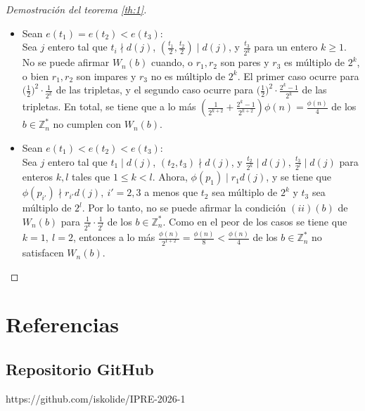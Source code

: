 \documentclass[hidelinks, 12pt]{article}
\newcommand{\Zs}{\mathbb{Z}^*}
\begin{document}
\begin{proof}[Demostración del teorema \ref{th:1}]
\begin{itemize}
\begin{enumerate}
\begin{itemize}
                \item Sean $e(t_1)=e(t_2)<e(t_3)$: \\
                Sea $j$ entero tal que $t_i\nmid d(j)$, $(\frac{t_1}{2},\frac{t_2}{2})\mid d(j)$, y $\frac{t_3}{2^k}$ para un entero $k\geq 1$. No se puede afirmar $W_n(b)$ cuando, o $r_1,r_2$ son pares y $r_3$ es múltiplo de $2^k$, o bien $r_1,r_2$ son impares y $r_3$ no es múltiplo de $2^k$. El primer caso ocurre para $\bigl(\frac{1}{2}\bigr)^2\cdot\frac{1}{2^k}$ de las tripletas, y el segundo caso ocurre para $\bigl(\frac{1}{2}\bigr)^2\cdot\frac{2^k-1}{2^k}$ de las tripletas. En total, se tiene que a lo más $\left(\frac{1}{2^{k+2}}+\frac{2^k-1}{2^{k+2}}\right)\phi(n)=\frac{\phi(n)}{4}$ de los $b\in\Zs_n$ no cumplen con $W_n(b)$.

                \item Sean $e(t_1)<e(t_2)<e(t_3)$: \\
                Sea $j$ entero tal que $t_1\mid d(j)$, $(t_2,t_3)\nmid d(j)$, y $\frac{t_2}{2^k}\mid d(j),~\frac{t_3}{2^l}\mid d(j)$ para enteros $k,l$ tales que $1\leq k<l$. Ahora, $\phi(p_1)\mid r_1d(j)$, y se tiene que $\phi(p_{i'})\nmid r_{i'}d(j),~i'=2,3$ a menos que $t_2$ sea múltiplo de $2^k$ y $t_3$ sea múltiplo de $2^l$. Por lo tanto, no se puede afirmar la condición $(ii)(b)$ de $W_n(b)$ para $\frac{1}{2^k}\cdot\frac{1}{2^l}$ de los $b\in\Zs_n$. Como en el peor de los casos se tiene que $k=1,~l=2$, entonces a lo más $\frac{\phi(n)}{2^{1+2}}=\frac{\phi(n)}{8}<\frac{\phi(n)}{4}$ de los $b\in\Zs_n$ no satisfacen $W_n(b)$.
            \end{itemize}
        \end{enumerate}
    \end{itemize}
\end{proof}

\newpage
\section{Referencias}
\renewcommand{\section}[2]{}
\printbibliography
\subsection{Repositorio GitHub}
https://github.com/iskolide/IPRE-2026-1

\end{document}
